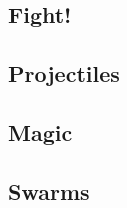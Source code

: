 \begin{multicols}{2}

\subsection*{}



\subsection*{Fight!}





\commonWeaponsChart





\subsection*{Projectiles}



\commonArmourChart

\subsection*{Magic}



\subsection*{Swarms}



\end{multicols}


